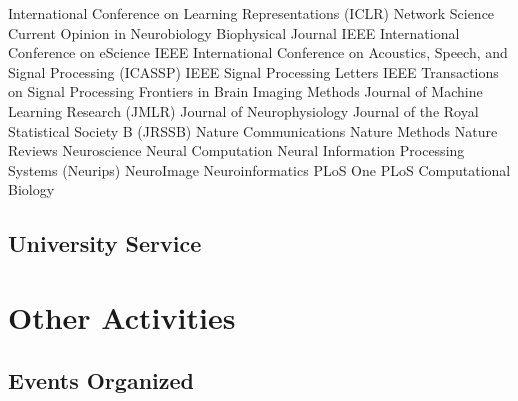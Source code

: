 \documentclass[10pt,colorlinks=true,urlcolor=blue]{moderncv}
\begin{document}
\cventry {} {International Conference on Learning Representations (ICLR)} {}{}{}{}
\cventry {} {Network Science} {}{}{}{}
\cventry {} {Current Opinion in Neurobiology} {}{}{}{}
\cventry {} {Biophysical Journal} {}{}{}{}
\cventry {} {IEEE International Conference on eScience} {}{}{}{}
\cventry {} {IEEE International Conference on Acoustics, Speech, and Signal Processing (ICASSP)}{}{}{}{}
\cventry {} {IEEE Signal Processing Letters} {} {} {} {}
\cventry {} {IEEE Transactions on Signal Processing} {}{}{}{}
\cventry {} {Frontiers in Brain Imaging Methods} {}{}{}{}
\cventry {} {Journal of Machine Learning Research (JMLR)} {}{}{}{}
\cventry {} {Journal of Neurophysiology} {}{}{}{}
\cventry {} {Journal of the Royal Statistical Society B (JRSSB)} {}{}{}{}
\cventry {} {Nature Communications} {}{}{}{}
\cventry {} {Nature Methods} {}{}{}{}
\cventry {} {Nature Reviews Neuroscience} {}{}{}{}
\cventry {} {Neural Computation} {}{}{}{}
\cventry {} {Neural Information Processing Systems (Neurips)} {}{}{}{}
\cventry {} {NeuroImage} {}{}{}{}
\cventry {} {Neuroinformatics} {}{}{}{}
\cventry {} {PLoS One} {}{}{}{}
\cventry {} {PLoS Computational Biology} {}{}{}{}


\subsection{University  Service}



\section{Other Activities}


\subsection{Events Organized}
\end{document}
